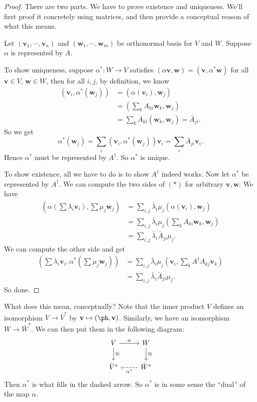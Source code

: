 \documentclass[a4paper]{article}
\begin{document}
\begin{proof}
  There are two parts. We have to prove existence and uniqueness. We'll first proof it concretely using matrices, and then provide a conceptual reason of what this means.

  Let $(\mathbf{v}_1, \cdots, \mathbf{v}_n)$ and $(\mathbf{w}_1, \cdots, \mathbf{w}_m)$ be orthonormal basis for $V$ and $W$. Suppose $\alpha$ is represented by $A$.

  To show uniqueness, suppose $\alpha^*: W \to V$ satisfies $(\alpha \mathbf{v}, \mathbf{w}) = (\mathbf{v}, \alpha^* \mathbf{w})$ for all $\mathbf{v} \in V$, $\mathbf{w} \in W$, then for all $i, j$, by definition, we know
  \begin{align*}
    (\mathbf{v}_i, \alpha^*(\mathbf{w}_j)) &= (\alpha(\mathbf{v}_i), \mathbf{w}_j) \\
    &= \left(\sum_k A_{ki} \mathbf{w}_k, \mathbf{w}_j\right)\\
    &= \sum_k \bar{A}_{ki} (\mathbf{w}_k, \mathbf{w}_j) = \bar{A}_{ji}.
  \end{align*}
  So we get
  \[
    \alpha^*(\mathbf{w}_j) = \sum_i (\mathbf{v}_i, \alpha^*(\mathbf{w}_j)) \mathbf{v}_i = \sum_i \bar{A}_{ji} \mathbf{v}_i.
  \]
  Hence $\alpha^*$ must be represented by $A^\dagger$. So $\alpha^*$ is unique.

  To show existence, all we have to do is to show $A^\dagger$ indeed works. Now let $\alpha^*$ be represented by $A^\dagger$. We can compute the two sides of $(*)$ for arbitrary $\mathbf{v}, \mathbf{w}$. We have
  \begin{align*}
    \left(\alpha\left(\sum \lambda_i \mathbf{v}_i\right), \sum \mu_j \mathbf{w}_j\right) &= \sum_{i, j} \bar{\lambda}_i \mu_j (\alpha(\mathbf{v}_i), \mathbf{w}_j)\\
    &= \sum_{i, j} \bar{\lambda}_i \mu_j \left(\sum_k A_{ki} \mathbf{w}_k, \mathbf{w}_j\right)\\
    &= \sum_{i, j} \bar{\lambda}_i \bar{A}_{ji} \mu_j.
  \end{align*}
  We can compute the other side and get
  \begin{align*}
    \left(\sum \lambda_i \mathbf{v}_i, \alpha^*\left(\sum \mu_j \mathbf{w}_j\right)\right) &= \sum_{i, j} \bar{\lambda}_i \mu_j \left(\mathbf{v}_i, \sum_k A^{\dagger} A_{kj} \mathbf{v}_k\right)\\
    &= \sum_{i, j} \bar{\lambda}_i \bar{A}_{ji} \mu_j.
  \end{align*}
  So done.
\end{proof}
What does this mean, conceptually? Note that the inner product $V$ defines an isomorphism $V \to \bar{V}^*$ by $\mathbf{v} \mapsto (\ph,\mathbf{v})$. Similarly, we have an isomorphism $W \to \bar{W}^*$. We can then put them in the following diagram:
\[
  \begin{tikzcd}
    V \ar[r, "\alpha"] \ar[d, "\cong"] & W \ar[d, "\cong"]\\
    \bar{V}^* & \bar{W}^* \ar[l, dashed, "\alpha^*"]
  \end{tikzcd}
\]
Then $\alpha^*$ is what fills in the dashed arrow. So $\alpha^*$ is in some sense the ``dual'' of the map $\alpha$.
\end{document}
